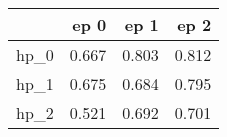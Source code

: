 \begin{tabular}{lrrr}
\toprule
{} &   ep 0 &   ep 1 &   ep 2 \\
\midrule
hp\_0 &  0.667 &  0.803 &  0.812 \\
hp\_1 &  0.675 &  0.684 &  0.795 \\
hp\_2 &  0.521 &  0.692 &  0.701 \\
\bottomrule
\end{tabular}
